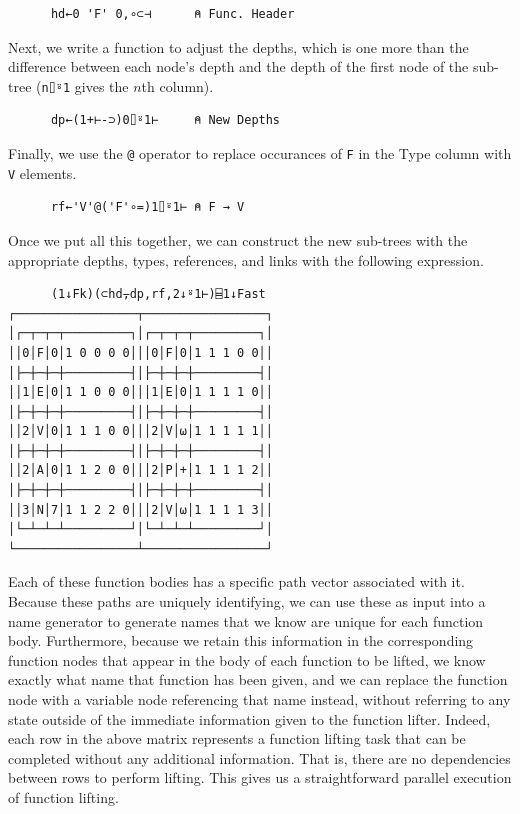 ﻿\documentclass[numbers,10pt,preprint]{sigplanconf}
\begin{document}
\begin{verbatim}
      hd←0 'F' 0,∘⊂⊣      ⍝ Func. Header
\end{verbatim}

\noindent Next, we write a function to adjust the depths, which is one more than the difference between each node's depth and the depth of the first node of the sub-tree (\verb;n⌷⍤1; gives the $n$th column). 

\begin{verbatim}
      dp←(1+⊢-⊃)0⌷⍤1⊢     ⍝ New Depths
\end{verbatim}

\noindent Finally, we use the \verb;@; operator to replace occurances of \verb;F; in the Type column with \verb;V; elements. 

\begin{verbatim}
      rf←'V'@('F'∘=)1⌷⍤1⊢ ⍝ F → V
\end{verbatim}

\noindent Once we put all this together, we can construct the new sub-trees with the appropriate depths, types, references, and links with the following expression.

\begin{verbatim}
      (1↓Fk)(⊂hd⍪dp,rf,2↓⍤1⊢)⌸1↓Fast
┌─────────────────┬─────────────────┐
│┌─┬─┬─┬─────────┐│┌─┬─┬─┬─────────┐│
││0│F│0│1 0 0 0 0│││0│F│0│1 1 1 0 0││
│├─┼─┼─┼─────────┤│├─┼─┼─┼─────────┤│
││1│E│0│1 1 0 0 0│││1│E│0│1 1 1 1 0││
│├─┼─┼─┼─────────┤│├─┼─┼─┼─────────┤│
││2│V│0│1 1 1 0 0│││2│V│⍵│1 1 1 1 1││
│├─┼─┼─┼─────────┤│├─┼─┼─┼─────────┤│
││2│A│0│1 1 2 0 0│││2│P│+│1 1 1 1 2││
│├─┼─┼─┼─────────┤│├─┼─┼─┼─────────┤│
││3│N│7│1 1 2 2 0│││2│V│⍵│1 1 1 1 3││
│└─┴─┴─┴─────────┘│└─┴─┴─┴─────────┘│
└─────────────────┴─────────────────┘
\end{verbatim}

Each of these function bodies has a specific path vector associated with it. Because these paths are uniquely identifying, we can use these as input into a name generator to generate names that we know are unique for each function body. Furthermore, because we retain this information in the corresponding function nodes that appear in the body of each function to be lifted, we know exactly what name that function has been given, and we can replace the function node with a variable node referencing that name instead, without referring to any state outside of the immediate information given to the function lifter. Indeed, each row in the above matrix represents a function lifting task that can be completed without any additional information. That is, there are no dependencies between rows to perform lifting. This gives us a straightforward parallel execution of function lifting.
\end{document}
